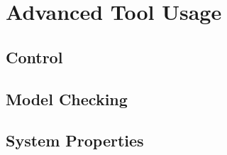 \section{Advanced Tool Usage}

\subsection{Control}

\subsection{Model Checking}

\subsection{System Properties}